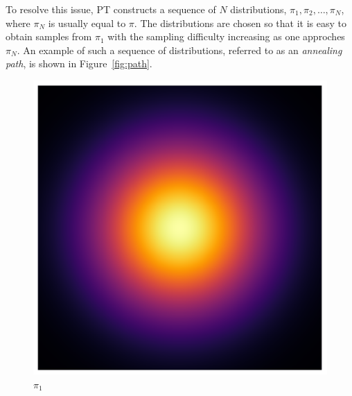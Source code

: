 \medskip
To resolve this issue, PT constructs a sequence of $N$ distributions,  
$\pi_1, \pi_2, \ldots, \pi_N$, where $\pi_N$ is usually equal to $\pi$.
The distributions are chosen so that it is easy to obtain samples from $\pi_1$
with the sampling difficulty increasing as one approches $\pi_N$. An example 
of such a sequence of distributions, referred to as an \textit{annealing path},
is shown in Figure~\ref{fig:path}.

\begin{figure}[t]
    \centering
    \begin{minipage}{0.15\textwidth}
      \centering
      \includegraphics[width=\textwidth]{../img/heatmap_path_1.pdf}
      \caption*{$\pi_1$}
    \end{minipage}
    \begin{minipage}{0.15\textwidth}
      \centering

\end{minipage}
\end{figure}
